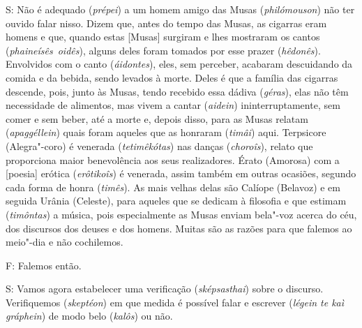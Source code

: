 S: Não é adequado (\emph{prépei}) a um homem amigo das Musas
(\emph{philómouson}) não ter ouvido falar nisso. Dizem que, antes do
tempo das Musas, as cigarras eram homens e que, quando estas [Musas]
surgiram e lhes mostraram os cantos (\emph{phaineísês}~\emph{oidês}),
alguns deles foram tomados por esse prazer (\emph{hêdonês}). Envolvidos
com o canto (\emph{áidontes}), eles, sem perceber, acabaram descuidando
da comida e da bebida, sendo levados à morte. Deles é que a família das
cigarras descende, pois, junto às Musas, tendo recebido essa dádiva
(\emph{géras}), elas não têm necessidade de alimentos, mas vivem a
cantar (\emph{aidein}) ininterruptamente, sem comer e sem beber, até a
morte e, depois disso, para as Musas relatam (\emph{apaggéllein}) quais
foram aqueles que as honraram (\emph{timâi}) aqui. Terpsicore
(Alegra"-coro) é venerada (\emph{tetimêkótas}) nas danças
(\emph{choroîs}), relato que proporciona maior benevolência aos seus
realizadores.\bekker{[259d]} Érato (Amorosa) com a [poesia] erótica
(\emph{erôtikoîs}) é venerada, assim também em outras ocasiões, segundo
cada forma de honra (\emph{timês}). As mais velhas delas são Calíope
(Belavoz) e em seguida Urânia (Celeste), para aqueles que se dedicam à
filosofia e que estimam (\emph{timôntas}) a música, pois especialmente
as Musas enviam bela"-voz acerca do céu, dos discursos dos deuses e dos
homens. Muitas são as razões para que falemos ao meio"-dia e não
cochilemos.

F: Falemos então.

\bekker{[259e]} S: Vamos agora estabelecer uma verificação
(\emph{sképsasthai}) sobre o discurso. Verifiquemos (\emph{skeptéon}) em
que medida é possível falar e escrever (\emph{légein te kaì gráphein})
de modo belo (\emph{kalôs}) ou não.


